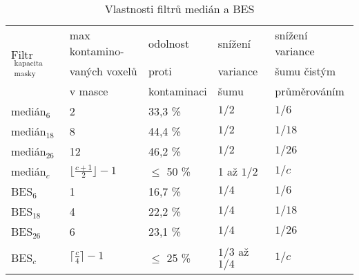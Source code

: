 \begin{table}[h]\label{tab med BES}
    \begin{center}
    \begin{tabular}{lllll}
      \toprule
      \multirow{3}{*}{Filtr$_{\mathrm{\substack{kapacita\\ masky}}}$} & max kontamino- & odolnost    & snížení    & snížení variance \\
                                                    & vaných voxelů   & proti       & variance   & šumu čistým      \\
                                                    & v masce         & kontaminaci & šumu       & průměrováním     \\
      \midrule
      medián$_{\mathrm{6}}$             & 2                 & 33,3 \%       & $1/2$    & $1/6$ \\
      medián$_{\mathrm{18}}$            & 8                 & 44,4 \%       & $1/2$    & $1/18$ \\
      medián$_{\mathrm{26}}$            & 12                & 46,2 \%       & $1/2$    & $1/26$  \\
      medián$_{c}$                      & $\lfloor\frac{c+1}{2}\rfloor-1$& $\le$ 50 \%& 1 až $1/2$& $1/c$\\
      BES$_{\mathrm{6}}$                & 1                 & 16,7 \%       & $1/4$   & $1/6$ \\
      BES$_{\mathrm{18}}$               & 4                 & 22,2 \%       & $1/4$   & $1/18$ \\
      BES$_{\mathrm{26}}$               & 6                 & 23,1 \%       & $1/4$   & $1/26$ \\
      BES$_{c}$                         & $\lceil\frac{c}{4}\rceil-1$& $\le$ 25 \%& $1/3$ až $1/4$& $1/c$\\
      \bottomrule
    \end{tabular}
    \caption{Vlastnosti filtrů medián a BES}
    \end{center}
\end{table}

